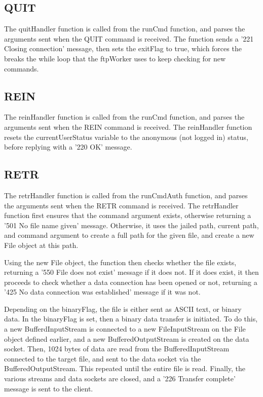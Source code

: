 \documentclass[11pt,a4paper,titlepage]{article}
\begin{document}
\subsection{QUIT}
The quitHandler function is called from the runCmd function, and parses the arguments sent when the QUIT command is received. The function sends a '221 Closing connection' message, then sets the exitFlag to true, which forces the breaks the while loop that the ftpWorker uses to keep checking for new commands.

\subsection{REIN}
The reinHandler function is called from the runCmd function, and parses the arguments sent when the REIN command is received. The reinHandler function resets the currentUserStatus variable to the anonymous (not logged in) status, before replying with a '220 OK' message.

\subsection{RETR}
The retrHandler function is called from the runCmdAuth function, and parses the arguments sent when the RETR command is received. The retrHandler function first ensures that the command argument exists, otherwise returning a '501 No file name given' message. Otherwise, it uses the jailed path, current path, and command argument to create a full path for the given file, and create a new File object at this path.

Using the new File object, the function then checks whether the file exists, returning a '550 File does not exist' message if it does not. If it does exist, it then proceeds to check whether a data connection has been opened or not, returning a '425 No data connection was established' message if it was not.

Depending on the binaryFlag, the file is either sent as ASCII text, or binary data. In the binaryFlag is set, then a binary data transfer is initiated. To do this, a new BufferdInputStream is connected to a new FileInputStream on the File object defined earlier, and a new BufferedOutputStream is created on the data socket. Then, 1024 bytes of data are read from the BufferedInputStream connected to the target file, and sent to the data socket via the BufferedOutputStream. This repeated until the entire file is read. Finally, the various streams and data sockets are closed, and a '226 Transfer complete' message is sent to the client.
\end{document}
